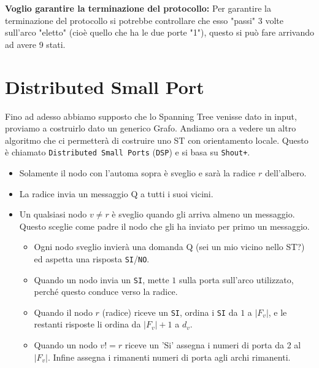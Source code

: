 \textbf{Voglio garantire la terminazione del protocollo: }
Per garantire la terminazione del protocollo si potrebbe controllare che esso
"passi" 3 volte sull'arco "eletto" (cioè quello che ha le due porte "1"), questo
si può fare arrivando ad avere 9 stati.

\section{Distributed Small Port}
Fino ad adesso abbiamo supposto che lo Spanning Tree venisse dato in input,
proviamo a costruirlo dato un generico Grafo. Andiamo ora a vedere un altro
algoritmo che ci permetterà di costruire uno ST con orientamento locale. Questo
è chiamato \texttt{Distributed Small Ports} (\texttt{DSP}) e si basa su
\texttt{Shout+}.
\begin{itemize}
    \item Solamente il nodo con l'automa sopra è sveglio e sarà la radice $r$
          dell'albero.
    \item La radice invia un messaggio Q a tutti i suoi vicini.
    \item Un qualsiasi nodo $v \neq r$ è sveglio quando gli arriva almeno un
          messaggio. Questo sceglie come padre il nodo che gli ha inviato per
          primo un messaggio.
          \begin{itemize}
              \item Ogni nodo sveglio invierà una domanda Q (sei un mio vicino
                    nello ST?) ed aspetta una risposta \texttt{SI}/\texttt{NO}.
              \item Quando un nodo invia un \texttt{SI}, mette $1$ sulla porta
                    sull'arco utilizzato, perché questo conduce verso la radice.
              \item Quando il nodo $r$ (radice) riceve un \texttt{SI}, ordina i
                    \texttt{SI} da $1$ a $|F_v|$, e le restanti risposte li
                    ordina da $|F_v|+1$ a $d_v$.
              \item Quando un nodo $v != r$ riceve un 'Si' assegna i numeri di
                    porta da 2 al $|F_v|$. Infine assegna i rimanenti numeri di
                    porta agli archi rimanenti.
          \end{itemize}
\end{itemize}

